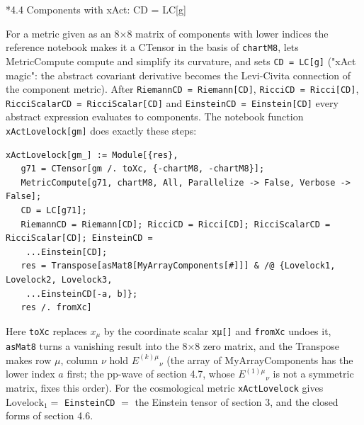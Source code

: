 \documentclass[10pt,a4paper]{article}
\makeatletter
\renewcommand\subsection{\@startsection{subsection}{2}{\z@}{-3.25ex\@plus -1ex \@minus -.2ex}{1.5ex \@plus .2ex}{\normalfont\large\bfseries\raggedright}}
\makeatother
\begin{document}
\subsection*{4.4 Components with xAct: CD = LC[g]}
For a metric given as an 8×8 matrix of components with lower indices the reference notebook makes it a CTensor in the basis of \texttt{chartM8}, lets MetricCompute compute and simplify its curvature, and sets \texttt{CD = LC[g]} ("xAct magic": the abstract covariant derivative becomes the Levi-Civita connection of the component metric). After \texttt{RiemannCD = Riemann[CD]}, \texttt{RicciCD = Ricci[CD]}, \texttt{RicciScalarCD = RicciScalar[CD]} and \texttt{EinsteinCD = Einstein[CD]} every abstract expression evaluates to components. The notebook function \texttt{xActLovelock[gm]} does exactly these steps:

\begin{Verbatim}[fontsize=\small,frame=single,framesep=2mm]
xActLovelock[gm_] := Module[{res},
   g71 = CTensor[gm /. toXc, {-chartM8, -chartM8}];
   MetricCompute[g71, chartM8, All, Parallelize -> False, Verbose -> False];
   CD = LC[g71];
   RiemannCD = Riemann[CD]; RicciCD = Ricci[CD]; RicciScalarCD = RicciScalar[CD]; EinsteinCD =
    ...Einstein[CD];
   res = Transpose[asMat8[MyArrayComponents[#]]] & /@ {Lovelock1, Lovelock2, Lovelock3,
    ...EinsteinCD[-a, b]};
   res /. fromXc]
\end{Verbatim}
Here \texttt{toXc} replaces $x_\mu$ by the coordinate scalar \texttt{xμ[]} and \texttt{fromXc} undoes it, \texttt{asMat8} turns a vanishing result into the 8×8 zero matrix, and the Transpose makes row $\mu$, column $\nu$ hold $E^{(k)\mu}{}_\nu$ (the array of MyArrayComponents has the lower index $a$ first; the pp-wave of section 4.7, whose $E^{(1)\mu}{}_\nu$ is not a symmetric matrix, fixes this order). For the cosmological metric \texttt{xActLovelock} gives $\mathrm{Lovelock}_1=$ \texttt{EinsteinCD} $=$ the Einstein tensor of section 3, and the closed forms of section 4.6.
\end{document}
